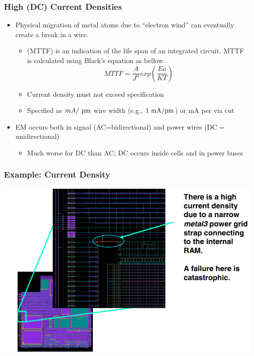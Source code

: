 \documentclass{beamer}
\begin{document}
	\begin{frame}
		\frametitle{High (DC) Current Densities}
		\begin{itemize}
			\item Physical migration of metal atoms due to “electron wind” can
			eventually create a break in a wire.
			\begin{itemize}
				\item (MTTF) is an indication of the life span of an integrated circuit. MTTF is calculated using Black’s equation as bellow.
			\begin{equation}
					MTTF = \frac{A}{J^n} exp(\frac{Ea}{KT})
				\end{equation}
			\item Current density must not exceed specification
			\item Specified as  \({mA}/~\mathrm{\text\textmu m}\)  wire width (e.g., \(1~\mathrm{mA/ \text\textmu m}\)) or mA per via cut
			\end{itemize}

			\item EM occurs both in signal (AC=bidirectional) and power wires
			(DC = unidirectional)
			\begin{itemize}
				\item Much worse for DC than AC; DC occurs inside cells and in power buses
			\end{itemize}
		\end{itemize}

	\end{frame}
	\begin{frame}
		\frametitle{Example: Current Density}
		\begin{center}
			\includegraphics[width=\textheight]{em4}
		\end{center}

	\end{frame}	
	
\end{document}

